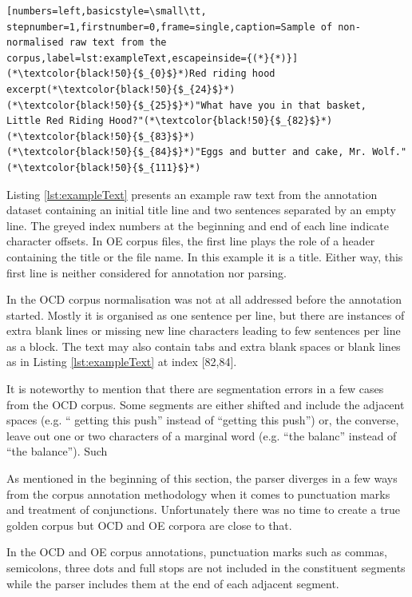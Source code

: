 \begin{minipage}{\linewidth}
\begin{lstlisting}[numbers=left,basicstyle=\small\tt, stepnumber=1,firstnumber=0,frame=single,caption=Sample of non-normalised raw text from the corpus,label=lst:exampleText,escapeinside={(*}{*)}]
(*\textcolor{black!50}{$_{0}$}*)Red riding hood excerpt(*\textcolor{black!50}{$_{24}$}*)
(*\textcolor{black!50}{$_{25}$}*)"What have you in that basket,   Little Red Riding Hood?"(*\textcolor{black!50}{$_{82}$}*)
(*\textcolor{black!50}{$_{83}$}*)
(*\textcolor{black!50}{$_{84}$}*)"Eggs and butter and cake, Mr. Wolf."(*\textcolor{black!50}{$_{111}$}*)
\end{lstlisting}
\end{minipage}

    Listing \ref{lst:exampleText} presents an example raw text from the annotation dataset containing an initial title line and two sentences separated by an empty line. The greyed index numbers at the beginning and end of each line indicate character offsets. In OE corpus files, the first line plays the role of a header containing the title or the file name. In this example it is a title. Either way, this first line is neither considered for annotation nor parsing. 
    
    In the OCD corpus normalisation was not at all addressed before the annotation started. Mostly it is organised as one sentence per line, but there are instances of extra blank lines or missing new line characters leading to few sentences per line as a block. The text may also contain tabs and extra blank spaces or blank lines as in Listing \ref{lst:exampleText} at index [82,84]. 

    It is noteworthy to mention that there are segmentation errors in a few cases from the OCD corpus. Some segments are either shifted and include the adjacent spaces (e.g. `` getting this push'' instead of ``getting this push'') or, the converse, leave out one or two characters of a marginal word (e.g. ``the balanc'' instead of ``the balance''). Such 

    As mentioned in the beginning of this section, the parser diverges in a few ways from the corpus annotation methodology when it comes to punctuation marks and treatment of conjunctions. Unfortunately there was no time to create a true golden corpus but OCD and OE corpora are close to that. 

    In the OCD and OE corpus annotations, punctuation marks such as commas, semicolons, three dots and full stops are not included in the constituent segments while the parser includes them at the end of each adjacent segment. 
    
